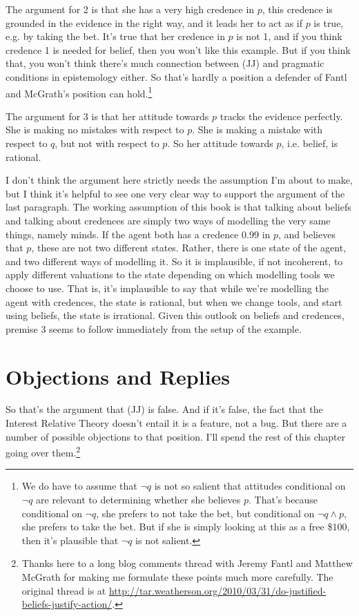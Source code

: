 The argument for 2 is that she has a very high credence in \(p\), this credence is grounded in the evidence in the right way, and it leads her to act as if \(p\) is true, e.g. by taking the bet. It's true that her credence in \(p\) is not 1, and if you think credence 1 is needed for belief, then you won't like this example. But if you think that, you won't think there's much connection between (JJ) and pragmatic conditions in epistemology either. So that's hardly a position a defender of Fantl and McGrath's position can hold.\footnote{We do have to assume that \(\neg q\) is not so salient that attitudes conditional on \(\neg q\) are relevant to determining whether she believes \(p\). That's because conditional on \(\neg q\), she prefers to not take the bet, but conditional on \(\neg q \wedge p\), she prefers to take the bet. But if she is simply looking at this as a free \$100, then it's plausible that \(\neg q\) is not salient.}

The argument for 3 is that her attitude towards \(p\) tracks the evidence perfectly. She is making no mistakes with respect to \(p\). She is making a mistake with respect to \(q\), but not with respect to \(p\). So her attitude towards \(p\), i.e. belief, is rational.

I don't think the argument here strictly needs the assumption I'm about to make, but I think it's helpful to see one very clear way to support the argument of the last paragraph. The working assumption of this book is that talking about beliefs and talking about credences are simply two ways of modelling the very same things, namely minds. If the agent both has a credence 0.99 in \(p\), and believes that \(p\), these are not two different states. Rather, there is one state of the agent, and two different ways of modelling it. So it is implausible, if not incoherent, to apply different valuations to the state depending on which modelling tools we choose to use. That is, it's implausible to say that while we're modelling the agent with credences, the state is rational, but when we change tools, and start using beliefs, the state is irrational. Given this outlook on beliefs and credences, premise 3 seems to follow immediately from the setup of the example.

\section{Objections and Replies}

So that's the argument that (JJ) is false. And if it's false, the fact that the Interest Relative Theory doesn't entail it is a feature, not a bug. But there are a number of possible objections to that position. I'll spend the rest of this chapter going over them.\footnote{Thanks here to a long blog comments thread with Jeremy Fantl and Matthew McGrath for making me formulate these points much more carefully. The original thread is at \url{http://tar.weatherson.org/2010/03/31/do-justified-beliefs-justify-action/}.}

